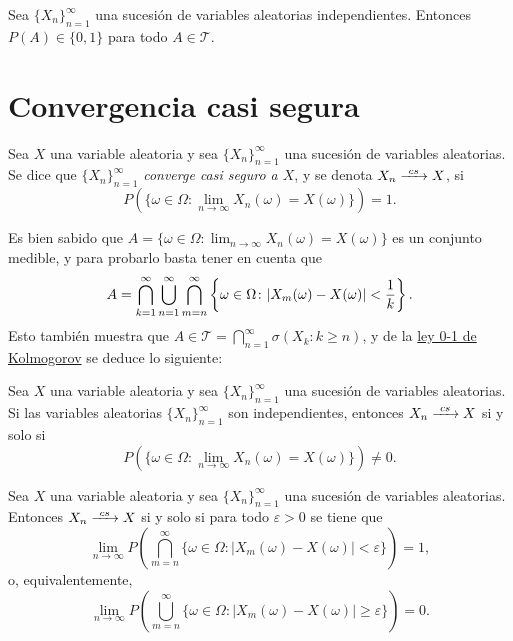 \documentclass[a4paper, 11pt, extrafontsizes]{memoir}
\begin{document}
\begin{theorem}\label{teo:1.10.8}
    Sea $\{X_n\}_{n=1}^\infty$ una sucesión de variables aleatorias independientes. Entonces $P(A) \in \{0,1\}$ para todo $A \in \mathcal{T}$.
\end{theorem}

\section{Convergencia casi segura}

\begin{definition}
    Sea $X$ una variable aleatoria y sea $\{X_n\}_{n=1}^\infty$ una sucesión de variables aleatorias. Se dice que $\{X_n\}_{n=1}^\infty$ \emph{converge casi seguro a $X$}, y se denota $X_n \csconv X$, si
    \[P(\{\omega \in \Omega \colon \lim_{n \to \infty}X_n(\omega) = X(\omega)\}) = 1.\]
\end{definition}

Es bien sabido que $A = \{\omega \in \Omega \colon \lim_{n \to \infty} X_n(\omega) = X(\omega)\}$ es un conjunto medible, y para probarlo basta tener en cuenta que
\[A = \bigcap_{k=1}^\infty \bigcup_{n = 1\vphantom{k}}^\infty \bigcap_{m=n\vphantom{k}}^\infty \left\{\omega \in \Omega \colon |X_m(\omega) - X(\omega)| < \frac{1}{k}\right\}.\]
Esto también muestra que $A \in \mathcal{T} = \bigcap_{n=1}^\infty \sigma(X_k \colon k \geq n)$, y de la \hyperref[teo:1.10.8]{\color{gray}ley 0-1 de Kolmogorov} se deduce lo siguiente:

\begin{corollary}
    Sea $X$ una variable aleatoria y sea $\{X_n\}_{n=1}^\infty$ una sucesión de variables aleatorias. Si las variables aleatorias $\{X_n\}_{n=1}^\infty$ son independientes, entonces $X_n \csconv X$ si y solo si
    \[P(\{\omega \in \Omega \colon \lim_{n \to \infty}X_n(\omega) = X(\omega)\}) \neq 0.\]
\end{corollary}

\begin{theorem}
    Sea $X$ una variable aleatoria y sea $\{X_n\}_{n=1}^\infty$ una sucesión de variables aleatorias. Entonces $X_n \csconv X$ si y solo si para todo $\varepsilon > 0$ se tiene que
    \[\lim_{n \to \infty} P\left(\bigcap_{m=n}^\infty \{\omega \in \Omega \colon |X_m(\omega) - X(\omega)| < \varepsilon\}\right) = 1,\]
    o, equivalentemente,
    \[\lim_{n \to \infty} P\left(\bigcup_{m=n}^\infty \{\omega \in \Omega \colon |X_m(\omega) - X(\omega)| \geq \varepsilon\}\right) = 0.\]
\end{theorem}
\end{document}

